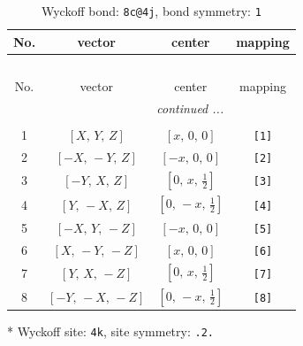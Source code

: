 \documentclass[fleqn,8pt]{jsarticle}
\begin{document}
\renewcommand{\arraystretch}{1.2}
\begin{longtable}{cccc}
\caption{Wyckoff bond: {\tt 8c@4j}, bond symmetry: {\tt 1}}
 \\
 \hline \hline
No. & vector & center & mapping \\ \hline \endfirsthead

\multicolumn{3}{l}{\tablename\ \thetable{}} \\
 \hline \hline
No. & vector & center & mapping \\ \hline \endhead

 \hline \hline
\multicolumn{3}{r}{\footnotesize\it continued ...} \\ \endfoot

 \hline \hline
\multicolumn{3}{r}{} \\ \endlastfoot

1 & $\left[ X,\, Y,\, Z \right]$ & $\left[ x,\, 0,\, 0 \right]$ & {\tt [1]} \\ \hline
2 & $\left[ - X,\, - Y,\, Z \right]$ & $\left[ - x,\, 0,\, 0 \right]$ & {\tt [2]} \\ \hline
3 & $\left[ - Y,\, X,\, Z \right]$ & $\left[ 0,\, x,\, \frac{1}{2} \right]$ & {\tt [3]} \\ \hline
4 & $\left[ Y,\, - X,\, Z \right]$ & $\left[ 0,\, - x,\, \frac{1}{2} \right]$ & {\tt [4]} \\ \hline
5 & $\left[ - X,\, Y,\, - Z \right]$ & $\left[ - x,\, 0,\, 0 \right]$ & {\tt [5]} \\ \hline
6 & $\left[ X,\, - Y,\, - Z \right]$ & $\left[ x,\, 0,\, 0 \right]$ & {\tt [6]} \\ \hline
7 & $\left[ Y,\, X,\, - Z \right]$ & $\left[ 0,\, x,\, \frac{1}{2} \right]$ & {\tt [7]} \\ \hline
8 & $\left[ - Y,\, - X,\, - Z \right]$ & $\left[ 0,\, - x,\, \frac{1}{2} \right]$ & {\tt [8]} \\
\end{longtable}
* Wyckoff site: {\tt 4k}, site symmetry: {\tt .2.}
\renewcommand{\arraystretch}{1.2}
\end{document}
